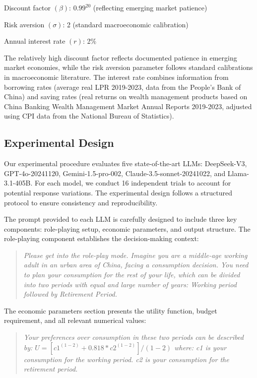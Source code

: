 \documentclass[12pt]{article}
\begin{document}
\begin{CJK*}{UTF8}{gbsn}
Discount factor $(\beta)$: $0.99^{20}$ (reflecting emerging market patience)

Risk aversion $(\sigma)$: 2 (standard macroeconomic calibration)

Annual interest rate $(r)$: 2\%

The relatively high discount factor reflects documented patience in emerging market economies, while the risk aversion parameter follows standard calibrations in macroeconomic literature. The interest rate combines information from borrowing rates (average real LPR 2019-2023, data from the People's Bank of China) and saving rates (real returns on wealth management products based on China Banking Wealth Management Market Annual Reports 2019-2023, adjusted using CPI data from the National Bureau of Statistics).

\subsection{Experimental Design}

Our experimental procedure evaluates five state-of-the-art LLMs: DeepSeek-V3, GPT-4o-20241120, Gemini-1.5-pro-002, Claude-3.5-sonnet-20241022, and Llama-3.1-405B. For each model, we conduct 16 independent trials to account for potential response variations. The experimental design follows a structured protocol to ensure consistency and reproducibility.

The prompt provided to each LLM is carefully designed to include three key components: role-playing setup, economic parameters, and output structure. The role-playing component establishes the decision-making context:

\begin{quote}
\itshape
Please get into the role-play mode. Imagine you are a middle-age working adult in an urban area of China, facing a consumption decision. You need to plan your consumption for the rest of your life, which can be divided into two periods with equal and large number of years: Working period followed by Retirement Period.
\end{quote}

The economic parameters section presents the utility function, budget requirement, and all relevant numerical values:

\begin{quote}
\itshape 
Your preferences over consumption in these two periods can be described by: $U = [c1^{(1-2)} + 0.818*c2^{(1-2)}]/(1-2)$ where: c1 is your consumption for the working period. c2 is your consumption for the retirement period.


\end{quote}
\end{CJK*}
\end{document}
